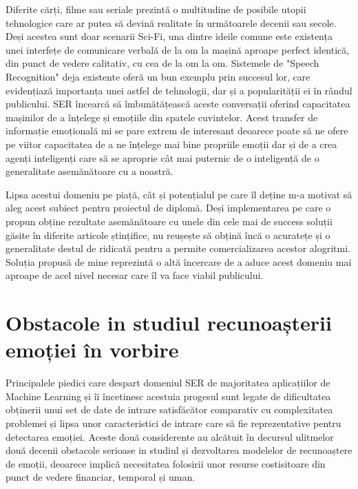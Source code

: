 \documentclass[a4paper,12pt]{book}
\begin{document}
					Diferite cărți, filme sau seriale prezintă o multitudine de posibile utopii tehnologice care ar putea să devină realitate în următoarele decenii sau secole. Deși acestea sunt doar scenarii Sci-Fi, una dintre ideile comune este existența unei interfețe de comunicare verbală de la om la mașină aproape perfect identică, din punct de vedere calitativ, cu cea de la om la om. Sistemele de "Speech Recognition" deja existente oferă un bun exemplu prin succesul lor, care evidențiază importanța unei astfel de tehnologii, dar și a popularității ei în rândul publicului. SER încearcă să îmbunătățească aceste conversații oferind capacitatea mașinilor de a înțelege și emoțiile din spatele cuvintelor. Acest transfer de informație emoțională mi se pare extrem de interesant deoarece poate să ne ofere pe viitor capacitatea de a ne înțelege mai bine propriile emoții dar și de a crea agenți inteligenți care să se aproprie cât mai puternic de o inteligență de o generalitate asemănătoare cu a noastră. \par
					
					Lipsa acestui domeniu pe piață, cât și potențialul pe care îl deține m-a motivat să aleg acest subiect pentru proiectul de diplomă. Deși implementarea pe care o propun obține rezultate asemănătoare cu unele din cele mai de success soluții găsite în diferite articole ștințifice, nu reușește să obțină încă o acuratețe și o  generalitate destul de ridicată pentru a permite comercializarea acestor alogritmi. Soluția propusă de mine reprezintă o altă încercare de a aduce acest domeniu mai aproape de acel nivel necesar care îl va face viabil publicului. \par  
										
			\section{Obstacole in studiul recunoașterii emoției în vorbire}	\label{obstacole}	
			 	Principalele piedici care despart domeniul SER de majoritatea aplicațiilor de Machine Learning și îi încetinesc acestuia progesul sunt legate de dificultatea obținerii unui set de date de intrare satisfăcător comparativ cu complexitatea problemei și lipsa unor caracteristici de intrare care să fie reprezentative pentru detectarea emoției. Aceste două considerente au alcătuit în decursul ulitmelor două decenii obstacole serioase in studiul și dezvoltarea modelelor de recunoaștere de emoții, deoarece implică necesitatea folosirii unor resurse costisitoare din punct de vedere financiar, temporal și uman.\par
				
\end{document}
